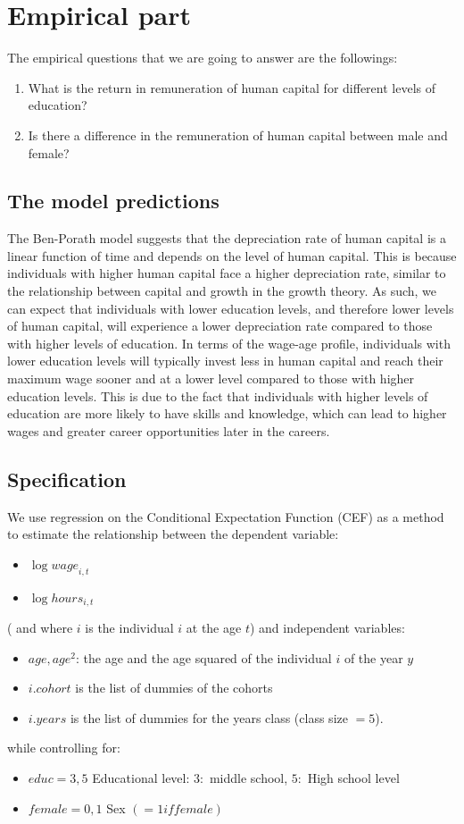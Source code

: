 \documentclass[12pt]{article}
\begin{document}
\section{Empirical part}
The empirical questions that we are going to answer are the followings:
\begin{enumerate}
    \item What is the return in remuneration of human capital for different levels of education?
    \item Is there a difference in the remuneration of human capital between male and female?
\end{enumerate}
\subsection{The model predictions}
The Ben-Porath model suggests that the depreciation rate of human capital is a linear function of time and depends on
the level of human capital. This is because individuals with higher human capital face a higher depreciation rate,
similar to the relationship between capital and growth in the growth theory. As such, we can expect that individuals
with lower education levels, and therefore lower levels of human capital, will experience a lower depreciation rate
compared to those with higher levels of education. \newline
In terms of the wage-age profile, individuals with lower education levels will typically invest less in human capital
and reach their maximum wage sooner and at a lower level compared to those with higher education levels. This is due to
the fact that individuals with higher levels of education are more likely to have  skills and knowledge, which can lead
to higher wages and greater career opportunities later in the careers.
\subsection{Specification}
We use regression on the Conditional Expectation Function (CEF) as a method to estimate the relationship between the
dependent variable:
\begin{itemize}
    \item $\log{wage}_{i,t}$
    \item $\log{hours}_{i,t}$
\end{itemize}
( and  where $i$ is the individual $i$ at the age $t$) and independent variables:
\begin{itemize}
    \item $age, age^2$: the age and the age squared of the individual $i$ of the year $y$
    \item $i.cohort$ is the list of dummies of the cohorts
    \item $i.years$ is the list of dummies for the years class (class size $=5$).
\end{itemize}
while controlling for:
\begin{itemize}
    \item $educ={3,5}$ Educational level: $3:$ middle school, $5:$ High school level
    \item $female={0,1}$  Sex $(=1 if female)$
\end{itemize}
\end{document}
